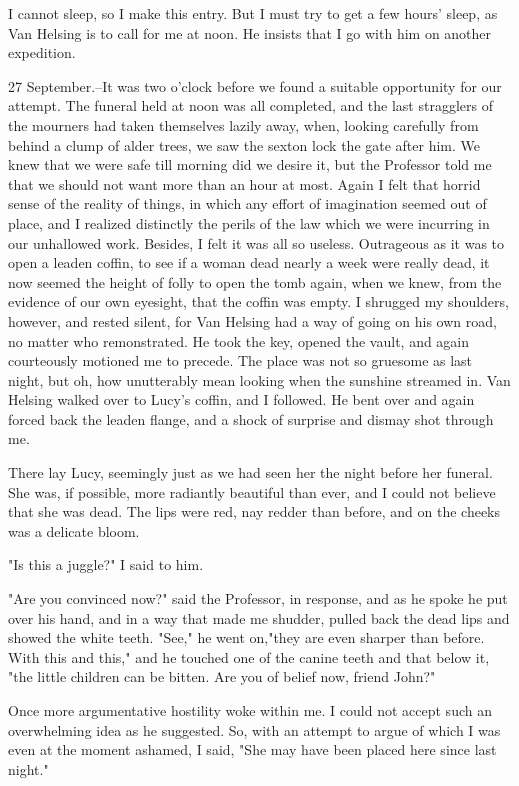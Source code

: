 I cannot sleep, so I make this entry. But I must try to get a few hours' sleep, as Van Helsing is to call for me at noon. He insists that I go with him on another expedition. 

27 September.--It was two o'clock before we found a suitable opportunity for our attempt. The funeral held at noon was all completed, and the last stragglers of the mourners had taken themselves lazily away, when, looking carefully from behind a clump of alder trees, we saw the sexton lock the gate after him. We knew that we were safe till morning did we desire it, but the Professor told me that we should not want more than an hour at most. Again I felt that horrid sense of the reality of things, in which any effort of imagination seemed out of place, and I realized distinctly the perils of the law which we were incurring in our unhallowed work. Besides, I felt it was all so useless. Outrageous as it was to open a leaden coffin, to see if a woman dead nearly a week were really dead, it now seemed the height of folly to open the tomb again, when we knew, from the evidence of our own eyesight, that the coffin was empty. I shrugged my shoulders, however, and rested silent, for Van Helsing had a way of going on his own road, no matter who remonstrated. He took the key, opened the vault, and again courteously motioned me to precede. The place was not so gruesome as last night, but oh, how unutterably mean looking when the sunshine streamed in. Van Helsing walked over to Lucy's coffin, and I followed. He bent over and again forced back the leaden flange, and a shock of surprise and dismay shot through me. 

There lay Lucy, seemingly just as we had seen her the night before her funeral. She was, if possible, more radiantly beautiful than ever, and I could not believe that she was dead. The lips were red, nay redder than before, and on the cheeks was a delicate bloom. 

"Is this a juggle?" I said to him. 

"Are you convinced now?" said the Professor, in response, and as he spoke he put over his hand, and in a way that made me shudder, pulled back the dead lips and showed the white teeth. "See," he went on,"they are even sharper than before. With this and this," and he touched one of the canine teeth and that below it, "the little children can be bitten. Are you of belief now, friend John?" 

Once more argumentative hostility woke within me. I could not accept such an overwhelming idea as he suggested. So, with an attempt to argue of which I was even at the moment ashamed, I said, "She may have been placed here since last night." 

